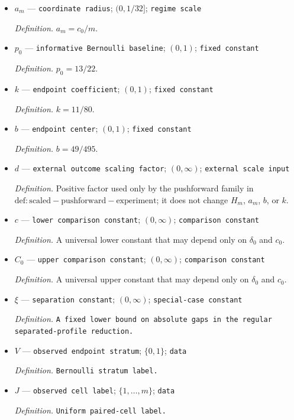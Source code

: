 \documentclass{article}
\begin{document}
\begin{itemize}
  \item \(a_m\) --- \texttt{coordinate radius}; \((0,1/32]\); \texttt{regime scale}
  \par\smallskip\noindent\emph{Definition.} \(a_m=c_0/m\).
  \item \(p_0\) --- \texttt{informative Bernoulli baseline}; \((0,1)\); \texttt{fixed constant}
  \par\smallskip\noindent\emph{Definition.} \(p_0=13/22\).
  \item \(k\) --- \texttt{endpoint coefficient}; \((0,1)\); \texttt{fixed constant}
  \par\smallskip\noindent\emph{Definition.} \(k=11/80\).
  \item \(b\) --- \texttt{endpoint center}; \((0,1)\); \texttt{fixed constant}
  \par\smallskip\noindent\emph{Definition.} \(b=49/495\).
  \item \(d\) --- \texttt{external outcome scaling factor}; \((0,\infty)\); \texttt{external scale input}
  \par\smallskip\noindent\emph{Definition.} Positive factor used only by the pushforward family in \(\mathrm{def:scaled-pushforward-experiment}\); it does not change \(H_m\), \(a_m\), \(b\), or \(k\).
  \item \(c\) --- \texttt{lower comparison constant}; \((0,\infty)\); \texttt{comparison constant}
  \par\smallskip\noindent\emph{Definition.} A universal lower constant that may depend only on \(\delta_0\) and \(c_0\).
  \item \(C_0\) --- \texttt{upper comparison constant}; \((0,\infty)\); \texttt{comparison constant}
  \par\smallskip\noindent\emph{Definition.} A universal upper constant that may depend only on \(\delta_0\) and \(c_0\).
  \item \(\xi\) --- \texttt{separation constant}; \((0,\infty)\); \texttt{special-\allowbreak{}case constant}
  \par\smallskip\noindent\emph{Definition.} \texttt{A fixed lower bound on absolute gaps in the regular separated-\allowbreak{}profile reduction.}
  \item \(V\) --- \texttt{observed endpoint stratum}; \(\{0,1\}\); \texttt{data}
  \par\smallskip\noindent\emph{Definition.} \texttt{Bernoulli stratum label.}
  \item \(J\) --- \texttt{observed cell label}; \(\{1,\ldots,m\}\); \texttt{data}
  \par\smallskip\noindent\emph{Definition.} \texttt{Uniform paired-\allowbreak{}cell label.}

\end{itemize}
\end{document}
